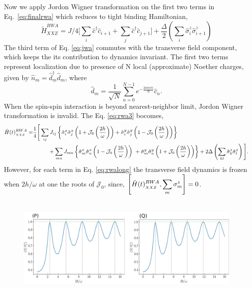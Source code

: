 \documentclass[aps,prb,reprint,showpacs,floatfix,superscriptaddress, onecolumn, nofootinbib, 9pt]{revtex4-2}
\begin{document}
\begin{enumerate}
{\begin{equation}
	\label{eq:finalrwa}
\end{equation}
Now we apply Jordon Wigner transformation on the first two terms in Eq.~\eqref{eq:finalrwa} which reduces to tight binding Hamiltonian, 
\begin{equation}
	\tilde{H}^{RWA}_{XXZ} = J/4\big[ \sum_i\hat{c}^\dagger\hat{c}_{i+1}  + \sum_j\hat{c}^\dagger\hat{c}_{j+1}\big] + \frac{\Delta}{2}\left(\sum_{i}  \hat{\sigma}_{i}^{z} \hat{\sigma}_{i+1}^{z}\right)
	\label{eq:jwa}
\end{equation}
The third term of Eq. \eqref{eq:jwa} commutes with the transverse field component, which keeps the its contribution to dynamics invariant. The first two terms represent localization due to presence of N local (approximate) Noether charges, given by $\hat{n}_m= \hat{d}^{\dagger}_m\hat{d}^{\;}_m$, where
\begin{equation}
\hat{d}_m = \frac{1}{\sqrt{N}}\sum_{n=0}^{N-1}e^{-\frac{2nm\pi i}{N}}\hat{c}_n.
\end{equation}
When the spin-spin interaction is beyond nearest-neighbor limit, Jordon Wigner transformation is invalid. The Eq. \eqref{eq:rwa3} bocomes,
\begin{align}
	\tilde{H}(t)^{RWA}_{_{XXZ}}= & \frac14\Bigg[\sum_{ij} J_{ij}\left\{ \hat{\sigma}^x_i \hat{\sigma}^x_{j}\left(1+ \mathcal{J}_0\left(\frac{2h}{\omega}\right)\right) + \hat{\sigma}^y_i \hat{\sigma}^y_{j} \left(1- \mathcal{J}_0\left(\frac{2h}{\omega}\right)\right)\right\}\nonumber\\
	& \hskip1cm + \sum_{mn} J_{mn}\left\{ \hat{\sigma}^x_m \hat{\sigma}^x_{n}\left(1- \mathcal{J}_0\left(\frac{2h}{\omega}\right)\right)\ + \hat{\sigma}^y_m \hat{\sigma}^y_{n} \left(1+ \mathcal{J}_0\left(\frac{2h}{\omega}\right)\right)\right\}+ 2\Delta \left(\sum_{kl}  \hat{\sigma}_{k}^{z} \hat{\sigma}_{l}^{z}\right)\Bigg].
	\label{eq:rwalong}
\end{align}
However, for each term in Eq. \eqref{eq:rwalong} the transverse field dynamics is frozen when $2h/\omega$ at one the roots of $\mathcal{J}_0$, since, $\displaystyle \comm{\tilde{H}(t)^{RWA}_{_{XXZ}}}{\displaystyle\sum_m\sigma^z_m}=0$. 
\begin{figure}[t]
	\includegraphics[height=5cm]{xxz_d.png}

\end{figure}}
\end{enumerate}
\end{document}
